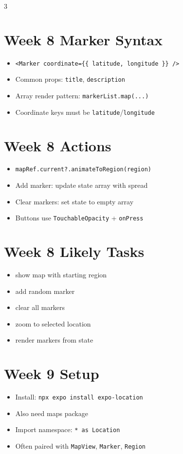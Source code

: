 \documentclass[10pt,letterpaper]{article}
\begin{document}
\begin{multicols}{3}
\section*{Week 8 Marker Syntax}
\begin{itemize}
  \item \texttt{<Marker coordinate=\{\{ latitude, longitude \}\} />}
  \item Common props: \texttt{title}, \texttt{description}
  \item Array render pattern: \texttt{markerList.map(...) }
  \item Coordinate keys must be \texttt{latitude}/\texttt{longitude}
\end{itemize}

\section*{Week 8 Actions}
\begin{itemize}
  \item \texttt{mapRef.current?.animateToRegion(region)}
  \item Add marker: update state array with spread
  \item Clear markers: set state to empty array
  \item Buttons use \texttt{TouchableOpacity} + \texttt{onPress}
\end{itemize}

\section*{Week 8 Likely Tasks}
\begin{itemize}
  \item show map with starting region
  \item add random marker
  \item clear all markers
  \item zoom to selected location
  \item render markers from state
\end{itemize}

\section*{Week 9 Setup}
\begin{itemize}
  \item Install: \texttt{npx expo install expo-location}
  \item Also need maps package
  \item Import namespace: \texttt{* as Location}
  \item Often paired with \texttt{MapView}, \texttt{Marker}, \texttt{Region}
\end{itemize}


\end{multicols}
\end{document}
